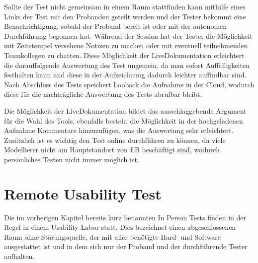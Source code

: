 Sollte der Test nicht gemeinsam in einem Raum stattfinden kann mithilfe eines Links der Test mit den Probanden geteilt werden und der Tester bekommt eine Benachrichtigung, sobald der Proband bereit ist oder mit der autonomen Durchführung begonnen hat.
Während der Session hat der Tester die Möglichkeit mit Zeitstempel versehene Notizen zu machen oder mit eventuell teilnehmenden Teamkollegen zu chatten.
Diese Möglichkeit der Live\-Dokumentation erleichtert die darauffolgende Auswertung des Test ungemein, da man sofort Auffälligkeiten festhalten kann und diese in der Aufzeichnung dadurch leichter auffindbar sind.
Nach Abschluss des Tests speichert Looback die Aufnahme in der Cloud, wodurch diese für die nachträgliche Auswertung des Tests abrufbar bleibt. \cite{.10.01.2020}

Die Möglichkeit der Live\-Dokumentation bildet das ausschlaggebende Argument für die Wahl des Tools, ebenfalls besteht die Möglichkeit in der hochgeladenen Aufnahme Kommentare hinzuzufügen, was die Auswertung sehr erleichtert.
Zusätzlich ist es wichtig den Test online durchführen zu können, da viele Modellierer nicht am Hauptstandort von EB beschäftigt sind, wodurch persönliches Testen nicht immer möglich ist.

\section{Remote Usability Test}
Die im vorherigen Kapitel bereits kurz benannten In Person Tests finden in der Regel in einem Usability Labor statt.
Dies bezeichnet einen abgeschlossenen Raum ohne Störungsquelle, der mit aller benötigte Hard- und Software ausgestattet ist und in dem sich nur der Proband und der durchführende Tester aufhalten.


